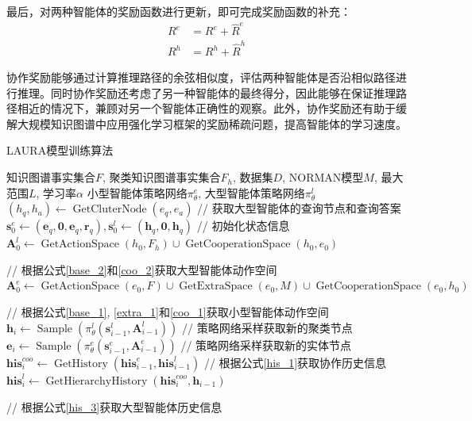 \documentclass[algorithmlist, AutoFakeBold, AutoFakeSlant, figurelist, tablelist, nomlist, engineering]{seuthesix}
\begin{document}
最后，对两种智能体的奖励函数进行更新，即可完成奖励函数的补充：
\begin{equation}
  \begin{aligned}
    R^e &= R^e + \hat{R}^e \\
    R^h &= R^h + \hat{R}^h
  \end{aligned}
  \label{similar_reward}
\end{equation}

协作奖励能够通过计算推理路径的余弦相似度，评估两种智能体是否沿相似路径进行推理。同时协作奖励还考虑了另一种智能体的最终得分，因此能够在保证推理路径相近的情况下，兼顾对另一个智能体正确性的观察。此外，协作奖励还有助于缓解大规模知识图谱中应用强化学习框架的奖励稀疏问题，提高智能体的学习速度。

\begin{algorithm}[H]
	\caption{LAURA模型训练算法}  
	\label{algorithm_dualagent}
	\begin{algorithmic}[1]
  \Require 知识图谱事实集合$F$, 聚类知识图谱事实集合$F_h$, 数据集$D$, NORMAN模型$M$, 最大范围$L$, 学习率$\alpha$
  \Ensure 小型智能体策略网络$\pi_\theta^e$, 大型智能体策略网络$\pi_\theta^l$
  \State $(h_q, h_a) \leftarrow \operatorname{GetCluterNode}(e_q, e_a)$ // 获取大型智能体的查询节点和查询答案
  \State $\bm{s}_{0}^{e} \leftarrow (\bm{e}_q, \bm{0}, \bm{e}_q, \bm{r}_q), \bm{s}_{0}^{l} \leftarrow (\bm{h}_q, \bm{0}, \bm{h}_q)$ // 初始化状态信息
  \State $\bm{A}_{0}^{l} \leftarrow \operatorname{GetActionSpace}(h_0, F_h) \cup \operatorname{GetCooperationSpace}(h_0, e_0)$ \par\quad// 根据公式\ref{base_2}和\ref{coo_2}获取大型智能体动作空间
  \State $\bm{A}_{0}^{e} \leftarrow \operatorname{GetActionSpace}(e_0, F) \cup \operatorname{GetExtraSpace}(e_0, M) \cup \operatorname{GetCooperationSpace}(e_0, h_0)$ \par\quad// 根据公式\ref{base_1}, \ref{extra_1}和\ref{coo_1}获取小型智能体动作空间
  \State $\bm{h}_i \leftarrow \operatorname{Sample}(\pi_\theta^l(\bm{s}_{i-1}^{l}, \bm{A}_{i-1}^{l}))$ // 策略网络采样获取新的聚类节点
  \State $\bm{e}_i \leftarrow \operatorname{Sample}(\pi_\theta^e(\bm{s}_{i-1}^{e}, \bm{A}_{i-1}^{e}))$ // 策略网络采样获取新的实体节点
  \State $\bm{his}_{i}^{coo} \leftarrow \operatorname{GetHistory}(\bm{his}_{i-1}^{e}, \bm{his}_{i-1}^{l})$ // 根据公式\ref{his_1}获取协作历史信息
  \State $\bm{his}_{i}^{l} \leftarrow \operatorname{GetHierarchyHistory}(\bm{his}_{i}^{coo}, \bm{h}_{i-1})$ \par\quad\quad // 根据公式\ref{his_3}获取大型智能体历史信息

\end{algorithmic}
\end{algorithm}
\end{document}
